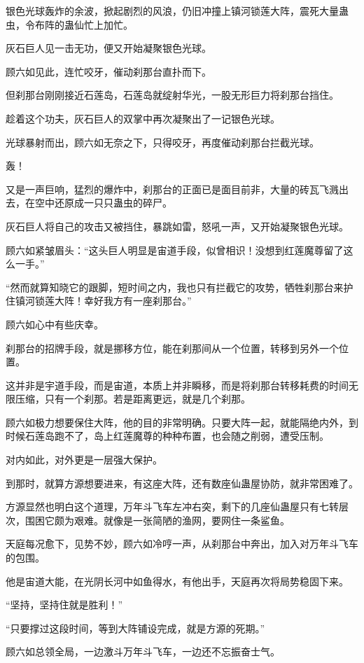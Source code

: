\begin{this_body}
银色光球轰炸的余波，掀起剧烈的风浪，仍旧冲撞上镇河锁莲大阵，震死大量蛊虫，令布阵的蛊仙忙上加忙。

灰石巨人见一击无功，便又开始凝聚银色光球。

顾六如见此，连忙咬牙，催动刹那台直扑而下。

但刹那台刚刚接近石莲岛，石莲岛就绽射华光，一股无形巨力将刹那台挡住。

趁着这个功夫，灰石巨人的双掌中再次凝聚出了一记银色光球。

光球暴射而出，顾六如无奈之下，只得咬牙，再度催动刹那台拦截光球。

轰！

又是一声巨响，猛烈的爆炸中，刹那台的正面已是面目前非，大量的砖瓦飞溅出去，在空中还原成一只只蛊虫的碎尸。

灰石巨人将自己的攻击又被挡住，暴跳如雷，怒吼一声，又开始凝聚银色光球。

顾六如紧皱眉头：“这头巨人明显是宙道手段，似曾相识！没想到红莲魔尊留了这么一手。”

“然而就算知晓它的跟脚，短时间之内，我也只有拦截它的攻势，牺牲刹那台来护住镇河锁莲大阵！幸好我方有一座刹那台。”

顾六如心中有些庆幸。

刹那台的招牌手段，就是挪移方位，能在刹那间从一个位置，转移到另外一个位置。

这并非是宇道手段，而是宙道，本质上并非瞬移，而是将刹那台转移耗费的时间无限压缩，只有一个刹那。若是距离更远，就是几个刹那。

顾六如极力想要保住大阵，他的目的非常明确。只要大阵一起，就能隔绝内外，到时候石莲岛跑不了，岛上红莲魔尊的种种布置，也会随之削弱，遭受压制。

对内如此，对外更是一层强大保护。

到那时，就算方源想要进来，有这座大阵，还有数座仙蛊屋协防，就非常困难了。

方源显然也明白这个道理，万年斗飞车左冲右突，剩下的几座仙蛊屋只有七转层次，围困它颇为艰难。就像是一张简陋的渔网，要网住一条鲨鱼。

天庭每况愈下，见势不妙，顾六如冷哼一声，从刹那台中奔出，加入对万年斗飞车的包围。

他是宙道大能，在光阴长河中如鱼得水，有他出手，天庭再次将局势稳固下来。

“坚持，坚持住就是胜利！”

“只要撑过这段时间，等到大阵铺设完成，就是方源的死期。”

顾六如总领全局，一边激斗万年斗飞车，一边还不忘振奋士气。


\end{this_body}
